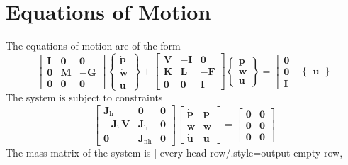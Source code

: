\chapter{Equations of Motion}
The equations of motion are of the form
\[
\begin{bmatrix}
{\mathbf I} & {\bm 0} & {\bm 0} \\ {\bm 0} & {\mathbf M} & -{\mathbf G} \\ {\bm 0} & {\bm 0} & {\bm 0}
\end{bmatrix}
\begin{Bmatrix}
\dot{\bm p}\\ \dot{\bm w} \\ \dot{\bm u}
\end{Bmatrix}
+\begin{bmatrix}
{\mathbf V} & -{\mathbf I} & {\bm 0} \\ {\mathbf K} & {\mathbf L} & -{\mathbf F} \\ {\bm 0} & {\bm 0} & {\mathbf I}
\end{bmatrix}
\begin{Bmatrix}
{\bm p}\\ {\bm w}\\ {\bm u}
\end{Bmatrix}
=\begin{bmatrix}
{\bm 0}\\ {\bm 0}\\ {\mathbf I}
\end{bmatrix}
\begin{Bmatrix}
{\bm u}
\end{Bmatrix}
\]
The system is subject to constraints
\[
\begin{bmatrix}
\mathbf{J}_\textrm{h} & {\bm 0} & {\bm 0}\\-{\mathbf J}_\textrm{h}{\mathbf V} & {\mathbf J}_\textrm{h} & {\bm 0}\\ {\bm 0} & {\mathbf J}_\textrm{nh} & {\bm 0}
\end{bmatrix}
\begin{bmatrix}
\dot{\bm p} & {\bm p} \\ \dot{\bm w} & {\bm w} \\ \dot{\bm u} & {\bm u}
\end{bmatrix}
=\begin{bmatrix}
{\bm 0} & {\bm 0}\\{\bm 0} & {\bm 0}\\{\bm 0} & {\bm 0}
\end{bmatrix}
\]
The mass matrix of the system is
\pgfplotstabletypeset[
every head row/.style={output empty row},
